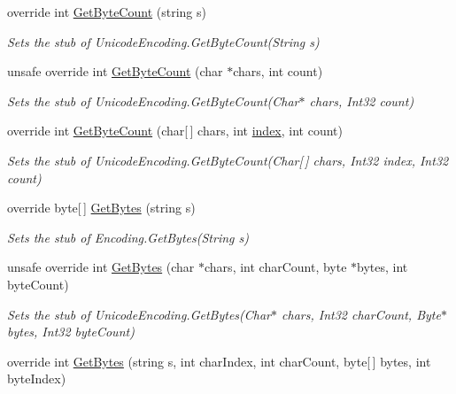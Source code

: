 \begin{DoxyCompactItemize}
override int \hyperlink{class_system_1_1_text_1_1_fakes_1_1_stub_unicode_encoding_a56545d05204411981aa848f97a52f7b4}{Get\-Byte\-Count} (string s)
\begin{DoxyCompactList}\small\item\em Sets the stub of Unicode\-Encoding.\-Get\-Byte\-Count(\-String s)\end{DoxyCompactList}\item 
unsafe override int \hyperlink{class_system_1_1_text_1_1_fakes_1_1_stub_unicode_encoding_abca71afe2762dc87aeb1f88b489f3e7f}{Get\-Byte\-Count} (char $\ast$chars, int count)
\begin{DoxyCompactList}\small\item\em Sets the stub of Unicode\-Encoding.\-Get\-Byte\-Count(\-Char$\ast$ chars, Int32 count)\end{DoxyCompactList}\item 
override int \hyperlink{class_system_1_1_text_1_1_fakes_1_1_stub_unicode_encoding_a45ec704acb03f0fe824f62598ac2dbcc}{Get\-Byte\-Count} (char\mbox{[}$\,$\mbox{]} chars, int \hyperlink{jquery-1_810_82-vsdoc_8js_a75bb12d1f23302a9eea93a6d89d0193e}{index}, int count)
\begin{DoxyCompactList}\small\item\em Sets the stub of Unicode\-Encoding.\-Get\-Byte\-Count(\-Char\mbox{[}$\,$\mbox{]} chars, Int32 index, Int32 count)\end{DoxyCompactList}\item 
override byte\mbox{[}$\,$\mbox{]} \hyperlink{class_system_1_1_text_1_1_fakes_1_1_stub_unicode_encoding_ae38404da26afbbbd09eedbe7ba5ac858}{Get\-Bytes} (string s)
\begin{DoxyCompactList}\small\item\em Sets the stub of Encoding.\-Get\-Bytes(\-String s)\end{DoxyCompactList}\item 
unsafe override int \hyperlink{class_system_1_1_text_1_1_fakes_1_1_stub_unicode_encoding_a9a3efd0972efb081a756d1270100db65}{Get\-Bytes} (char $\ast$chars, int char\-Count, byte $\ast$bytes, int byte\-Count)
\begin{DoxyCompactList}\small\item\em Sets the stub of Unicode\-Encoding.\-Get\-Bytes(\-Char$\ast$ chars, Int32 char\-Count, Byte$\ast$ bytes, Int32 byte\-Count)\end{DoxyCompactList}\item 
override int \hyperlink{class_system_1_1_text_1_1_fakes_1_1_stub_unicode_encoding_ae8a12daf02b413b0013423f567cb47a1}{Get\-Bytes} (string s, int char\-Index, int char\-Count, byte\mbox{[}$\,$\mbox{]} bytes, int byte\-Index)

\end{DoxyCompactItemize}
